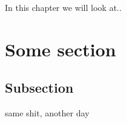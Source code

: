 In this chapter we will look at..

\section{Some section}

\subsection{Subsection}
same shit, another day
